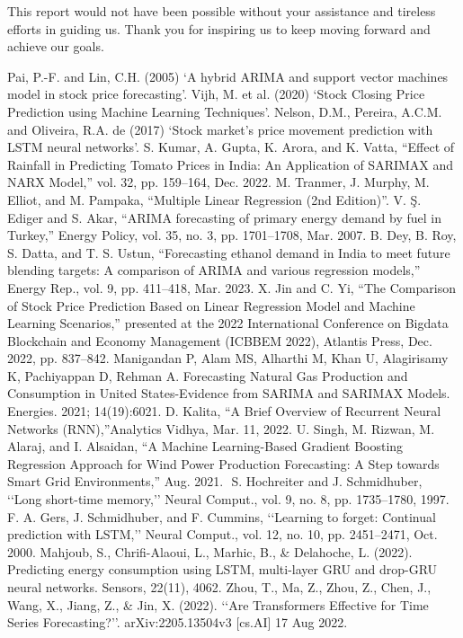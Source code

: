 \documentclass{ieeeojies}
\begin{document}
This report would not have been possible without your assistance and tireless efforts in guiding us. Thank you for inspiring us to keep moving forward and achieve our goals.
\begin{thebibliography}{00}
     Pai, P.-F. and Lin, C.H. (2005) ‘A hybrid ARIMA and support vector machines model in stock price forecasting’.
     Vijh, M. et al. (2020) ‘Stock Closing Price Prediction using Machine Learning Techniques’.
    Nelson, D.M., Pereira, A.C.M. and Oliveira, R.A. de (2017) ‘Stock market’s price movement prediction with LSTM neural networks’.
    S. Kumar, A. Gupta, K. Arora, and K. Vatta, “Effect of Rainfall in Predicting Tomato Prices in India: An Application of SARIMAX and NARX Model,” vol. 32, pp. 159–164, Dec. 2022.
    M. Tranmer, J. Murphy, M. Elliot, and M. Pampaka, “Multiple Linear Regression (2nd Edition)”.
    V. Ş. Ediger and S. Akar, “ARIMA forecasting of primary energy demand by fuel in Turkey,” Energy Policy, vol. 35, no. 3, pp. 1701–1708, Mar. 2007.
    B. Dey, B. Roy, S. Datta, and T. S. Ustun, “Forecasting ethanol demand in India to meet future blending targets: A comparison of ARIMA and various regression models,” Energy Rep., vol. 9, pp. 411–418, Mar. 2023.
    X. Jin and C. Yi, “The Comparison of Stock Price Prediction Based on Linear Regression Model and Machine Learning Scenarios,” presented at the 2022 International Conference on Bigdata Blockchain and Economy Management (ICBBEM 2022), Atlantis Press, Dec. 2022, pp. 837–842.
    Manigandan P, Alam MS, Alharthi M, Khan U, Alagirisamy K, Pachiyappan D, Rehman A. Forecasting Natural Gas Production and Consumption in United States-Evidence from SARIMA and SARIMAX Models. Energies. 2021; 14(19):6021.
    D. Kalita, “A Brief Overview of Recurrent Neural Networks (RNN),”Analytics Vidhya, Mar. 11, 2022.
    U. Singh, M. Rizwan, M. Alaraj, and I. Alsaidan, “A Machine Learning-Based Gradient Boosting Regression Approach for Wind Power Production Forecasting: A Step towards Smart Grid Environments,” Aug. 2021.
    ‌ S. Hochreiter and J. Schmidhuber, ‘‘Long short-time memory,’’ Neural Comput., vol. 9, no. 8, pp. 1735–1780, 1997.
    F. A. Gers, J. Schmidhuber, and F. Cummins, ‘‘Learning to forget:
    Continual prediction with LSTM,’’ Neural Comput., vol. 12, no. 10, pp. 2451–2471, Oct. 2000.
    Mahjoub, S., Chrifi-Alaoui, L., Marhic, B., \& Delahoche, L. (2022). Predicting energy consumption using LSTM, multi-layer GRU and drop-GRU neural networks. Sensors, 22(11), 4062.
    Zhou, T., Ma, Z., Zhou, Z., Chen, J., Wang, X., Jiang, Z., \& Jin, X. (2022).
    ‘‘Are Transformers Effective for Time Series Forecasting?’’. arXiv:2205.13504v3 [cs.AI] 17 Aug 2022.

\end{thebibliography}
\EOD
\end{document}
